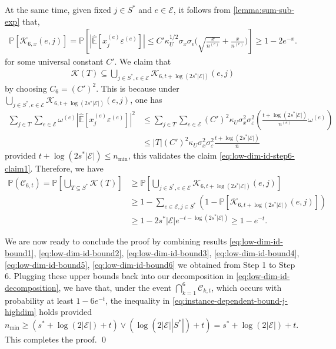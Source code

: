 \documentclass[10pt]{article}
\numberwithin{equation}{section}
\begin{document}
At the same time, given fixed $j\in S^*$ and $e\in \mathcal{E}$, it follows from \cref{lemma:sum-sub-exp} that,
\begin{align*}
    \mathbb{P}[\mathcal{K}_{6,x}(e, j)] = \mathbb{P}\left[ \left|\hat{\mathbb{E}}[x_j^{(e)} \varepsilon^{(e)}]\right| \le C'\kappa_U^{1/2}\sigma_x\sigma_\epsilon \Bigg(\sqrt{\frac{x}{n^{(e)}}} + \frac{x}{n^{(e)}}\Bigg)\right] \ge 1- 2e^{-x}.
\end{align*} for some universal constant $C'$. We claim that
\begin{align}
\label{eq:low-dim-id-step6-claim1}
    \mathcal{K}(T) \subseteq \bigcup_{j\in S^*, e\in \mathcal{E}} \mathcal{K}_{6,t + \log(2s^*|\mathcal{E}|)}(e,j) 
\end{align} by choosing $C_6=(C')^2$. This is because under $\bigcup_{j\in S^*, e\in \mathcal{E}} \mathcal{K}_{6,t + \log(2s^*|\mathcal{E}|)}(e,j)$, one has
\begin{align*}
    \sum_{j\in T} \sum_{e\in \mathcal{E}} \omega^{(e)} \left|\hat{\mathbb{E}}[x_j^{(e)}\varepsilon^{(e)}]\right|^2 &\le \sum_{j\in T} \sum_{e\in \mathcal{E}} (C')^2 \kappa_U \sigma_x^2\sigma_\varepsilon^2\left(\frac{t + \log(2s^*|\mathcal{E}|)}{n^{(e)}} \omega^{(e)}\right) \\
    &\le |T| (C')^2 \kappa_U \sigma_x^2\sigma_\varepsilon^2\frac{t + \log(2s^*|\mathcal{E}|)}{\bar{n}}
\end{align*} provided $t+\log(2s^*|\mathcal{E}|) \le n_{\min}$, this validates the claim \eqref{eq:low-dim-id-step6-claim1}. Therefore, we have
\begin{align*}
    \mathbb{P}(\mathcal{C}_{6,t}) = \mathbb{P} \left[\bigcup_{T\subseteq S^*} \mathcal{K}(T)\right] &\ge \mathbb{P} \left[ \bigcup_{j\in S^*, e\in \mathcal{E}} \mathcal{K}_{6,t + \log(2s^*|\mathcal{E}|)}(e,j) \right]\\
    &\ge 1 - \sum_{e\in \mathcal{E}, j\in S^*} \left(1-\mathbb{P}\left[\mathcal{K}_{6,t + \log(2s^*|\mathcal{E}|)}(e,j)\right]\right) \\
    &\ge 1-2s^*|\mathcal{E}|e^{-t - \log(2s^*|\mathcal{E}|)} \ge 1-e^{-t}.
\end{align*}

 We are now ready to conclude the proof by combining results \eqref{eq:low-dim-id-bound1}, \eqref{eq:low-dim-id-bound2}, \eqref{eq:low-dim-id-bound3}, \eqref{eq:low-dim-id-bound4}, \eqref{eq:low-dim-id-bound5}, \eqref{eq:low-dim-id-bound6} we obtained from {\sc Step 1} to {\sc Step 6}. Plugging these upper bounds back into our decomposition in \eqref{eq:low-dim-id-decomposition}, we have that, under the event $\bigcap_{k=1}^6\mathcal{C}_{k,t}$, which occurs with probability at least $1-6e^{-t}$, the inequality in \eqref{eq:instance-dependent-bound-j-highdim} holds provided $n_{\min} \ge (s^* + \log(2|\mathcal{E}|) + t) \lor (\log(2|\mathcal{E}||S^*|) + t) = s^* + \log(2|\mathcal{E}|) + t$. This completes the proof. \qed
\end{document}

